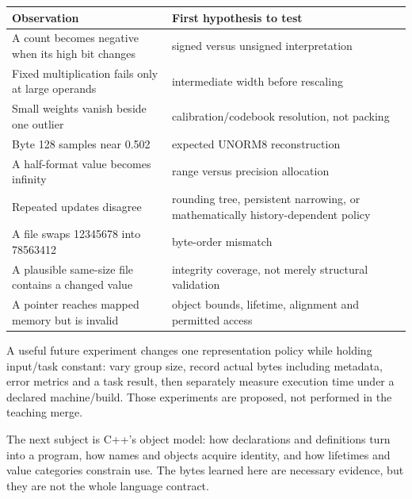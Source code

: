 \hypertarget{01-foundations-i-ch002-diagnose-the-layer-before-changing-the-implementation}{}

{\def\LTcaptype{none} %
\begin{longtable}[]{@{}
  >{\raggedright\arraybackslash}p{}
  >{\raggedright\arraybackslash}p{}@{}}
\toprule\noalign{}
\begin{minipage}[b]{\linewidth}\raggedright
Observation
\end{minipage} & \begin{minipage}[b]{\linewidth}\raggedright
First hypothesis to test
\end{minipage} \\
\midrule\noalign{}
\endhead
\bottomrule\noalign{}
\endlastfoot
A count becomes negative when its high bit changes & signed versus unsigned interpretation \\
Fixed multiplication fails only at large operands & intermediate width before rescaling \\
Small weights vanish beside one outlier & calibration/codebook resolution, not packing \\
Byte 128 samples near 0.502 & expected UNORM8 reconstruction \\
A half-format value becomes infinity & range versus precision allocation \\
Repeated updates disagree & rounding tree, persistent narrowing, or mathematically history-dependent policy \\
A file swaps 12345678 into 78563412 & byte-order mismatch \\
A plausible same-size file contains a changed value & integrity coverage, not merely structural validation \\
A pointer reaches mapped memory but is invalid & object bounds, lifetime, alignment and permitted access \\
\end{longtable}
}

A useful future experiment changes one representation policy while holding input/task constant: vary group size, record actual bytes including metadata, error metrics and a task result, then separately measure execution time under a declared machine/build. Those experiments are proposed, not performed in the teaching merge.

The next subject is C++'s object model: how declarations and definitions turn into a program, how names and objects acquire identity, and how lifetimes and value categories constrain use. The bytes learned here are necessary evidence, but they are not the whole language contract.

